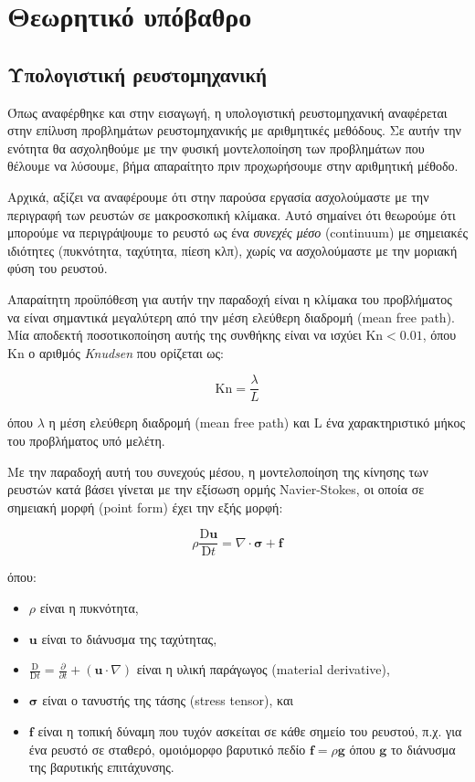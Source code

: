\chapter{Θεωρητικό υπόβαθρο}
\label{chapter:theory}

\section{Υπολογιστική ρευστομηχανική}

Όπως αναφέρθηκε και στην εισαγωγή, η υπολογιστική ρευστομηχανική αναφέρεται στην επίλυση προβλημάτων ρευστομηχανικής με αριθμητικές μεθόδους.
Σε αυτήν την ενότητα θα ασχοληθούμε με την φυσική μοντελοποίηση των προβλημάτων που θέλουμε να λύσουμε, βήμα απαραίτητο πριν προχωρήσουμε στην αριθμητική μέθοδο.

Αρχικά, αξίζει να αναφέρουμε ότι στην παρούσα εργασία ασχολούμαστε με την περιγραφή των ρευστών σε μακροσκοπική κλίμακα.
Αυτό σημαίνει ότι θεωρούμε ότι μπορούμε να περιγράψουμε το ρευστό ως ένα \emph{συνεχές μέσο} (continuum) με σημειακές ιδιότητες (πυκνότητα, ταχύτητα, πίεση κλπ), χωρίς να ασχολούμαστε με την μοριακή φύση του ρευστού.

Απαραίτητη προϋπόθεση για αυτήν την παραδοχή είναι η κλίμακα του προβλήματος να είναι σημαντικά μεγαλύτερη από την μέση ελεύθερη διαδρομή (mean free path).
Μία αποδεκτή ποσοτικοποίηση αυτής της συνθήκης είναι να ισχύει $\mathrm{Kn} < 0.01$, όπου $\mathrm{Kn}$ ο αριθμός \emph{Knudsen} που ορίζεται ως:

\begin{equation*}
    \mathrm{Kn} = \frac{\lambda}{L}
\end{equation*}

όπου $\lambda$ η μέση ελεύθερη διαδρομή (mean free path) και L ένα χαρακτηριστικό μήκος του προβλήματος υπό μελέτη.

Με την παραδοχή αυτή του συνεχούς μέσου, η μοντελοποίηση της κίνησης των ρευστών κατά βάσει γίνεται με την εξίσωση ορμής Navier-Stokes, οι οποία σε σημειακή μορφή (point form) έχει την εξής μορφή:

\begin{equation}
    \rho \frac{\mathrm{D} \mathbf{u}}{\mathrm{D}t} = \nabla \cdot \mathbf{\sigma} + \mathbf{f}
    \label{eq:cauchy}
\end{equation}

όπου:

\begin{itemize}
    \item $\rho$ είναι η πυκνότητα,
    \item $\mathbf{u}$ είναι το διάνυσμα της ταχύτητας,
    \item $\frac{\mathrm{D}}{\mathrm{D}t} = \frac{\partial}{\partial t} + (\mathbf{u} \cdot \nabla )$ είναι η υλική παράγωγος (material derivative),
    \item $\mathbf{\sigma}$ είναι ο τανυστής της τάσης (stress tensor), και
    \item $\mathbf{f}$ είναι η τοπική δύναμη που τυχόν ασκείται σε κάθε σημείο του ρευστού, π.χ. για ένα ρευστό σε σταθερό, ομοιόμορφο βαρυτικό πεδίο $\mathbf{f} = \rho \mathbf{g}$ όπου $\mathbf{g}$ το διάνυσμα της βαρυτικής επιτάχυνσης.
\end{itemize}

